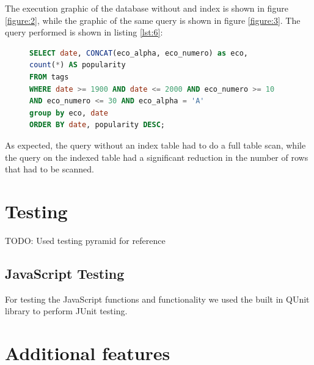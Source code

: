 \documentclass{article}
\begin{document}
The execution graphic of the database without and index is shown in figure
\ref{figure:2}, while the graphic of the same query is shown in figure
\ref{figure:3}. The query performed is shown in listing \ref{lst:6}:

\begin{figure}[h]
	\begin{lstlisting}[label={lst:6}, language=sql, frame=single,
	caption=Query used showing explanations of queries]
SELECT date, CONCAT(eco_alpha, eco_numero) as eco,
count(*) AS popularity
FROM tags
WHERE date >= 1900 AND date <= 2000 AND eco_numero >= 10
AND eco_numero <= 30 AND eco_alpha = 'A'
group by eco, date
ORDER BY date, popularity DESC;
	\end{lstlisting}
\end{figure}

As expected, the query without an index table had to do a full table scan,
while the query on the indexed table had a significant reduction in the
number of rows that had to be scanned.

\section{Testing}
TODO: Used testing pyramid for reference \cite{test}
\subsection{JavaScript Testing}
For testing the JavaScript functions and functionality we used the built
in QUnit library to perform JUnit testing.

\section{Additional features}



\end{document}
